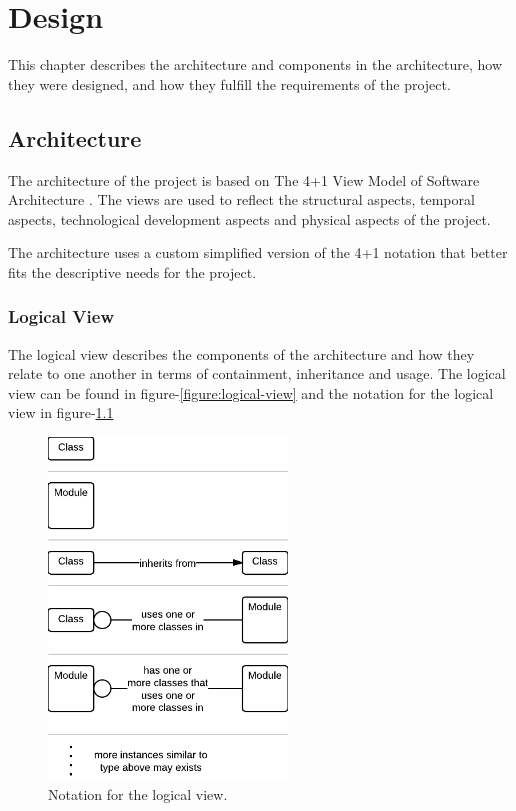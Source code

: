 
\chapter{Design}

\minitoc
This chapter describes the architecture and components in the architecture, how they were designed, and how they fulfill the requirements of the project.

\clearpage

\section{Architecture}
The architecture of the project is based on The 4+1 View Model of Software Architecture \cite{Kruchten}. The views are used to reflect the structural aspects, temporal aspects, technological development aspects and physical aspects of the project.

The architecture uses a custom simplified version of the 4+1 notation that better fits the descriptive needs for the project.


\subsection{Logical View}
The logical view describes the components of the architecture and how they relate to one another in terms of containment, inheritance and usage. The logical view can be found in figure-\ref{figure:logical-view} and the notation for the logical view in figure-\ref{figure:logical-view-notation}

\begin{figure}[H]
\centerline{\includegraphics[width=2.5in]{image/architecture-logical-view-notation.png}}
\caption[Notation for the logical view]{Notation for the logical view.}
\label{figure:logical-view-notation}
\end{figure}

